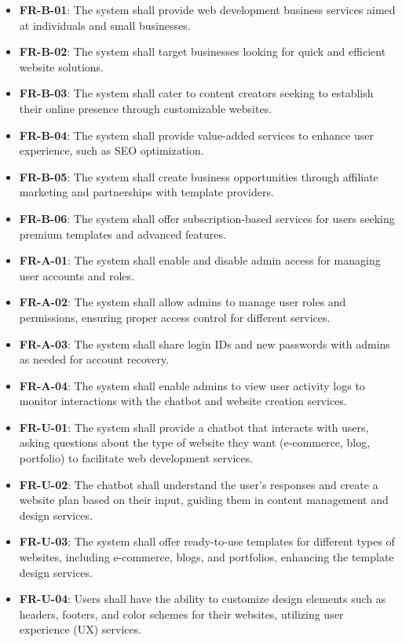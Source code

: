 \documentclass[12pt]{report}
\begin{document}
\begin{itemize}
    \item \textbf{FR-B-01}: The system shall provide web development business services aimed at individuals and small businesses.
    \item \textbf{FR-B-02}: The system shall target businesses looking for quick and efficient website solutions.
    \item \textbf{FR-B-03}: The system shall cater to content creators seeking to establish their online presence through customizable websites.
    \item \textbf{FR-B-04}: The system shall provide value-added services to enhance user experience, such as SEO optimization.
    \item \textbf{FR-B-05}: The system shall create business opportunities through affiliate marketing and partnerships with template providers.
    \item \textbf{FR-B-06}: The system shall offer subscription-based services for users seeking premium templates and advanced features.
    \item \textbf{FR-A-01}: The system shall enable and disable admin access for managing user accounts and roles.
    \item \textbf{FR-A-02}: The system shall allow admins to manage user roles and permissions, ensuring proper access control for different services.
    \item \textbf{FR-A-03}: The system shall share login IDs and new passwords with admins as needed for account recovery.
    \item \textbf{FR-A-04}: The system shall enable admins to view user activity logs to monitor interactions with the chatbot and website creation services.
    \item \textbf{FR-U-01}: The system shall provide a chatbot that interacts with users, asking questions about the type of website they want (e-commerce, blog, portfolio) to facilitate web development services.
    \item \textbf{FR-U-02}: The chatbot shall understand the user’s responses and create a website plan based on their input, guiding them in content management and design services.
    \item \textbf{FR-U-03}: The system shall offer ready-to-use templates for different types of websites, including e-commerce, blogs, and portfolios, enhancing the template design services.
    \item \textbf{FR-U-04}: Users shall have the ability to customize design elements such as headers, footers, and color schemes for their websites, utilizing user experience (UX) services.

\end{itemize}
\end{document}
